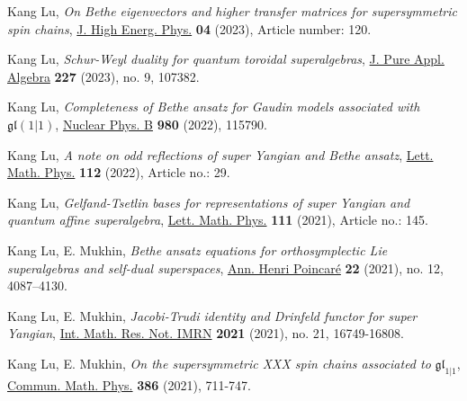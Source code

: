 \documentclass[11pt,letterpaper,roman,colorlinks,urlcolor=teal,linkcolor=teal]{moderncv} %
\begin{document}
\begin{etaremune}[leftmargin=1cm]
\item Kang Lu, {\textit{On Bethe eigenvectors and higher transfer matrices for supersymmetric spin chains}}, \href{https://doi.org/10.1007/JHEP04(2023)120}{J. High Energ. Phys.} \textbf{04} (2023), Article number: 120.
\item Kang Lu, {\textit{Schur-Weyl duality for quantum toroidal superalgebras}}, \href{https://doi.org/10.1016/j.jpaa.2023.107382}{J. Pure Appl. Algebra} \textbf{227} (2023), no. 9, 107382.

\item Kang Lu, {\textit{Completeness of Bethe ansatz for Gaudin models associated with} $\mathfrak{gl}(1|1)$}, \href{https://www.sciencedirect.com/science/article/pii/S0550321322001419}{Nuclear Phys. B} \textbf{980} (2022), 115790.

\item Kang Lu, {\textit{A note on odd reflections of super Yangian and Bethe ansatz}}, \href{https://link.springer.com/article/10.1007/s11005-022-01524-3}{Lett. Math. Phys.} \textbf{112} (2022), Article no.: 29.

\item Kang Lu, {\textit{Gelfand-Tsetlin bases for representations of super Yangian and quantum affine superalgebra}}, \href{https://link.springer.com/article/10.1007/s11005-021-01488-w}{Lett. Math. Phys.} \textbf{111} (2021), Article no.: 145.

\item Kang Lu, E. Mukhin, {\textit{Bethe ansatz equations for orthosymplectic Lie superalgebras and self-dual superspaces}}, \href{https://doi.org/10.1007/s00023-021-01091-8}{Ann. Henri Poincar\'{e}} \textbf{22} (2021), no. 12, 4087--4130.

\item Kang Lu, E. Mukhin, {\textit{Jacobi-Trudi identity and Drinfeld functor for super Yangian}}, \href{https://dx.doi.org/10.1093/imrn/rnab023}{Int. Math. Res. Not. IMRN} \textbf{2021} (2021), no. 21, 16749-16808.

\item Kang Lu, E. Mukhin, {\textit{On the supersymmetric XXX spin chains associated to} $\mathfrak{gl}_{1|1}$}, \href{https://dx.doi.org/10.1007/s00220-021-04155-2}{Commun. Math. Phys.} \textbf{386} (2021), 711-747.


\end{etaremune}
\end{document}
